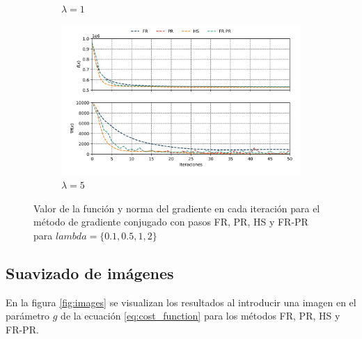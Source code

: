 \begin{figure}[H]
\begin{subfigure}{8.4cm}
        \caption{$\lambda = 1$}
    \end{subfigure}
    \begin{subfigure}{8.4cm}
        \includegraphics[width=1\textwidth]{Graphics/lambda_4.png}
        \caption{$\lambda = 5$}
    \end{subfigure}
    \caption{Valor de la función y norma del gradiente en cada iteración para el método de gradiente conjugado con pasos FR, PR, HS y FR-PR para $lambda=\{0.1, 0.5, 1,2\}$}
    \label{fig:function_gradient}
\end{figure}

\subsection{Suavizado de imágenes}

En la figura \ref{fig:images} se visualizan los resultados al introducir una imagen en el parámetro $g$ de la ecuación \ref{eq:cost_function} para los métodos FR, PR, HS y FR-PR.

